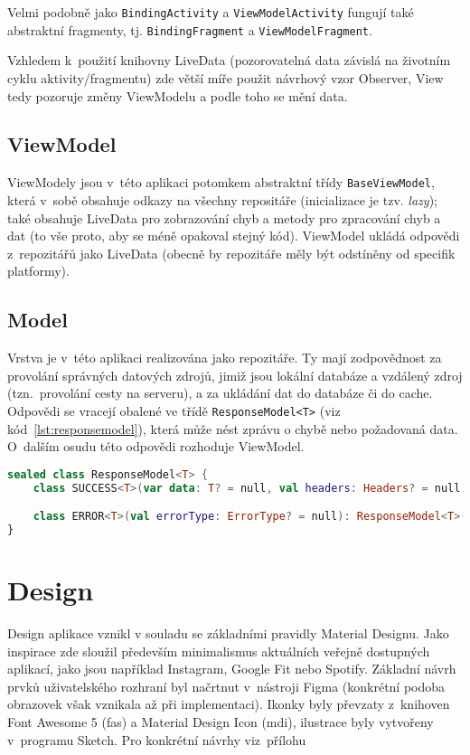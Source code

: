 \documentclass[twoside]{ctuthesis}
\begin{document}
Velmi podobně jako \texttt{BindingActivity} a \texttt{ViewModelActivity} fungují také abstraktní fragmenty, tj. \texttt{BindingFragment} a \texttt{ViewModelFragment}.

Vzhledem k~použití knihovny LiveData (pozorovatelná data závislá na životním cyklu aktivity/fragmentu) zde větší míře použit návrhový vzor Observer, View tedy pozoruje změny ViewModelu a podle toho se mění data.

\subsection{ViewModel}

ViewModely jsou v~této aplikaci potomkem abstraktní třídy \texttt{BaseViewModel}, která v~sobě obsahuje odkazy na všechny repositáře (inicializace je tzv. \textit{lazy}); také obsahuje LiveData pro zobrazování chyb a metody pro zpracování chyb a dat (to vše proto, aby se méně opakoval stejný kód). ViewModel ukládá odpovědi z~repozitářů jako LiveData (obecně by repozitáře měly být odstíněny od specifik platformy).

\subsection{Model}

Vrstva je v~této aplikaci realizována jako repozitáře. Ty mají zodpovědnost za provolání správných datových zdrojů, jimiž jsou lokální databáze a vzdálený zdroj (tzn.~provolání cesty na serveru), a za ukládání dat do databáze či do cache. Odpovědi se vracejí obalené ve třídě \texttt{ResponseModel<T>} (viz kód~\ref{lst:responsemodel}), která může nést zprávu o chybě nebo požadovaná data. O~dalším osudu této odpovědi rozhoduje ViewModel.

\begin{lstlisting}[language=Kotlin,caption={Třída \texttt{ResponseModel}},label={lst:responsemodel}]
sealed class ResponseModel<T> {
	class SUCCESS<T>(var data: T? = null, val headers: Headers? = null): ResponseModel<T>()

	class ERROR<T>(val errorType: ErrorType? = null): ResponseModel<T>()
}
\end{lstlisting}

\section{Design}\label{design}

Design aplikace vznikl v souladu se základními pravidly Material Designu. Jako inspirace zde sloužil především minimalismus aktuálních veřejně dos\-tup\-ných aplikací, jako jsou například Instagram, Google Fit nebo Spotify. Základní návrh prvků uživatelského rozhraní byl načrtnut v~nástroji Figma (konkrétní podoba obrazovek však vznikala až při implementaci). Ikonky byly převzaty z~knihoven Font Awesome 5 (fas) a Material Design Icon (mdi), ilustrace byly vytvořeny v~programu Sketch. Pro konkrétní návrhy viz~přílohu 
\end{document}
